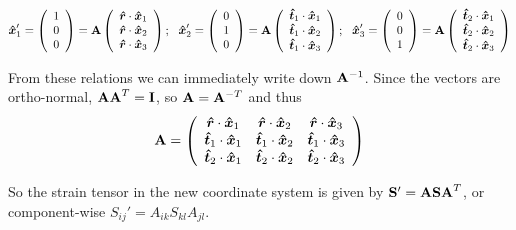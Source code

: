\documentclass[12pt]{article}
\begin{document}
$$
\bm{{\hat x}}_1' = \left(\begin{array}{c} 1 \\ 0 \\0\end{array}\right) = {\bf A}\left(\begin{array}{c} \bm{{\hat r}}\cdot \bm{{\hat x}}_1 \\ \bm{{\hat r}}\cdot \bm{{\hat x}}_2 \\\bm{{\hat r}}\cdot \bm{{\hat x}}_3\end{array}\right);~~
\bm{{\hat x}}_2' = \left(\begin{array}{c} 0 \\ 1 \\0\end{array}\right) = {\bf A}\left(\begin{array}{c}\bm{{\hat t}}_1\cdot \bm{{\hat x}}_1 \\ \bm{{\hat t}}_1 \cdot\bm{{\hat x}}_2 \\\bm{{\hat t}}_1 \cdot \bm{{\hat x}}_3 \end{array}\right);~~
\bm{{\hat x}}_3' = \left(\begin{array}{c} 0 \\ 0 \\1 \end{array}\right)= {\bf A}\left(\begin{array}{c}\bm{{\hat t}}_2\cdot \bm{{\hat x}}_1 \\ \bm{{\hat t}}_2 \cdot\bm{{\hat x}}_2 \\\bm{{\hat t}}_2 \cdot \bm{{\hat x}}_3 \end{array}\right)
$$

From these relations we can immediately write down 
${\bf A}^{-1}$.  Since the vectors are ortho-normal, 
${\bf A A}^{T} = {\bf I}$, so ${\bf A} = {\bf A}^{-T}$ and thus
$$
{\bf A} =  \left(\begin{array}{ccc}  
\bm{{\hat r}}\cdot \bm{{\hat x}}_1 & \bm{{\hat r}}\cdot \bm{{\hat x}}_2 &\bm{{\hat r}}\cdot \bm{{\hat x}}_3 \\
\bm{{\hat t}}_1\cdot \bm{{\hat x}}_1 & \bm{{\hat t}}_1 \cdot\bm{{\hat x}}_2 & \bm{{\hat t}}_1 \cdot \bm{{\hat x}}_3 \\
\bm{{\hat t}}_2\cdot \bm{{\hat x}}_1 & \bm{{\hat t}}_2 \cdot\bm{{\hat x}}_2 & \bm{{\hat t}}_2 \cdot \bm{{\hat x}}_3 
\end{array} 
\right)$$


So the strain tensor in the new coordinate system is  given by 
${\bf S}' = {\bf A S A}^{T}$, or component-wise
$S_{ij}' = A_{ik} S_{kl} A_{jl}$.
\end{document}
